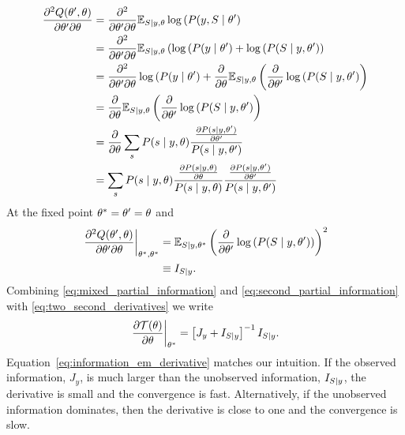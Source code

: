 \begin{align}
  \nonumber
  \frac{\partial^2 Q(\NewParameters,  \OldParameters)}{\partial \NewParameters \partial
  \OldParameters}
  &= \frac{\partial^2}{\partial \NewParameters \partial \OldParameters} \EV_{S \given y, \OldParameters}
    \log \left( P(y, S \given \NewParameters \right) \\
  \nonumber
  &= \frac{\partial^2}{\partial \NewParameters \partial \OldParameters} \EV_{S \given y, \OldParameters}
    \left( \log \left( P(y \given \NewParameters \right) + \log \left( P(S
    \given y, \NewParameters \right) \right)\\
  \nonumber
  &= \frac{\partial^2}{\partial \NewParameters \partial \OldParameters} \log \left( P(y \given
    \NewParameters \right) + \frac{\partial}{\partial \OldParameters} \EV_{S \given y, \OldParameters} \left(
    \frac{\partial}{\partial \NewParameters} \log \left( P(S \given y,
    \NewParameters \right) \right) \\
  \nonumber
  &=  \frac{\partial}{\partial \OldParameters} \EV_{S \given y, \OldParameters} \left(
    \frac{\partial}{\partial \NewParameters} \log \left( P(S \given y,
    \NewParameters \right) \right) \\
  \nonumber
  &= \frac{\partial}{\partial \OldParameters} \sum_s P(s \given y, \OldParameters) %
    \frac{ %
    \frac{\partial P(s \given y,\NewParameters )}{\partial \NewParameters}
    }{P(s \given y,\NewParameters )}  \\
  \nonumber
  &= \sum_s P(s \given y, \OldParameters) %
    \frac{ %
    \frac{\partial P(s \given y,\OldParameters )}{\partial \OldParameters}
    }{P(s \given y,\OldParameters )}
    \frac{ %
    \frac{\partial P(s \given y,\NewParameters )}{\partial \NewParameters}
    }{P(s \given y,\NewParameters )}
\end{align}
At the fixed point ${\theta^*} = \theta' = \theta$
and
\begin{align}
  \label{eq:score_fisher}
  \left. \frac{\partial^2 Q(\theta',  \theta)}{\partial \theta'
  \partial \theta} \right|_{{\theta^*}, {\theta^*}}
  &= \mathbb{E}_{S \mid y, {\theta^*}} \left( \frac{\partial}{\partial
    \theta'} \log \left( P(S \mid y, \theta' )\right) \right)^2\\
  \label{eq:mixed_partial_information}
  &\equiv I_{S \mid y}.
\end{align}
Combining \eqref{eq:mixed_partial_information} and
\eqref{eq:second_partial_information} with
\eqref{eq:two_second_derivatives} we write
\begin{equation}
  \label{eq:information_em_derivative}
  \left.\frac{\partial \EMmap(\theta)}{\partial \theta}
  \right|_{\EMfixedPoint} = \left[J_y + I_{S \given y}  \right]^{-1}
  I_{S \given y}.
\end{equation}
Equation~\eqref{eq:information_em_derivative} matches our intuition.
If the observed information, $J_y$, is much larger than the unobserved
information, $I_{S \mid y}$, the derivative is small and the
convergence is fast.  Alternatively, if the unobserved information
dominates, then the derivative is close to one and the convergence is
slow.

